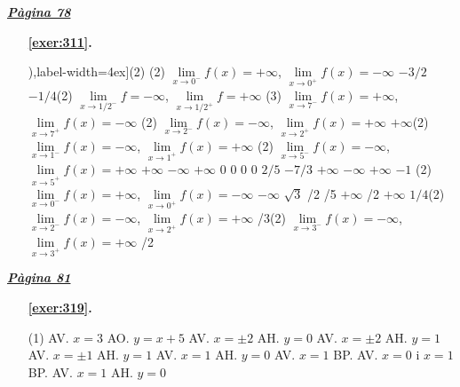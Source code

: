 
\hyperlink{page.78}{\textbf{\em Pàgina 78}}
\begin{enumerate}
\item[\fontfamily{phv}\selectfont\color{blue}\textbf{\ref{exer:311}. }] \label{ans:311} 
\begin{tasks}[counter-format=(tsk[1]),label-width=4ex](2) \task *(2) $\mathop {lim}\limits _{x\to 0^- } f(x)=+\infty $, $\mathop {lim}\limits _{x\to 0^+ } f(x)=-\infty $ \task $-3/2$ \task $-1/4$\startnewitemline \task *(2) $\mathop {lim}\limits _{x\to 1/2^- } f=-\infty $, $\mathop {lim}\limits _{x\to 1/2^+ } f=+\infty $ \startnewitemline \task *(3) $\mathop {lim}\limits _{x\to 7^- } f(x)=+\infty $, $\mathop {lim}\limits _{x\to 7^+ } f(x)=-\infty $ \task *(2) $\mathop {lim}\limits _{x\to 2^- } f(x)=-\infty $, $\mathop {lim}\limits _{x\to 2^+ } f(x)=+\infty $ \task $+\infty $\startnewitemline \task *(2) $\mathop {lim}\limits _{x\to 1^- } f(x)=-\infty $, $\mathop {lim}\limits _{x\to 1^+ } f(x)=+\infty $ \startnewitemline \task *(2) $\mathop {lim}\limits _{x\to 5^- } f(x)=-\infty $, $\mathop {lim}\limits _{x\to 5^+ } f(x)=+\infty $  \task $+\infty $ \task $-\infty $ \task $+\infty $ \task $0$ \task $0$ \task $0$ \task $0$ \task $2/5$ \task $-7/3$ \task $+\infty $ \task $-\infty $ \task $+\infty $ \task $-1$ \task *(2) $\mathop {lim}\limits _{x\to 0^- } f(x)=+\infty $, $\mathop {lim}\limits _{x\to 0^+ } f(x)=-\infty $ \task $-\infty $ \task $\sqrt {3}$ /2  /5 \task $+\infty $ /2   \task $+\infty $ \task $1/4$\startnewitemline \task *(2) $\mathop {lim}\limits _{x\to 2^- } f(x)=-\infty $, $\mathop {lim}\limits _{x\to 2^+ } f(x)=+\infty $  /3\startnewitemline \task *(2) $\mathop {lim}\limits _{x\to 3^- } f(x)=-\infty $, $\mathop {lim}\limits _{x\to 3^+ } f(x)=+\infty $ /2 \end{tasks}
 \end{enumerate}
\vspace{0.3cm}


\hyperlink{page.81}{\textbf{\em Pàgina 81}}
\begin{enumerate}



 \item[\fontfamily{phv}\selectfont\color{blue}\textbf{\ref{exer:319}. }] \label{ans:319}
 \begin{tasks}[column-sep=1em, item-indent=1.3333em](1)
	 \task AV. $x=3$ AO. $y=x+5$
	 \task AV. $x=\pm 2$ AH. $y=0$
	 \task AV. $x=\pm 2$ AH. $y=1$
	 \task AV. $x=\pm 1$ AH. $y=1$
	 \task AV. $x=1$ AH. $y=0$
	 \task AV. $x=1$ BP.
	 \task AV. $x=0$ i $x=1$ BP.
	 \task AV. $x=1$ AH. $y=0$
\end{tasks}
 \end{enumerate}
\vspace{0.3cm}

